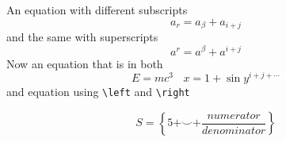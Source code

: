 \documentclass{article}
\begin{document}
An equation with different subscripts
\[
a_r=a_\beta+a_{i+j}
\]
and the same with superscripts
\[
a^r=a^\beta+a^{i+j}
\]
Now an equation that is in both
\[
E=mc^3\ \ \ \ x=1+\sin y^{i+j+\cdots}
\]
and equation using \verb|\left| and \verb|\right|

\[
S=\left    \{ 5+\smile+\frac{numerator}{denominator} \right \}
\]
\end{document}
